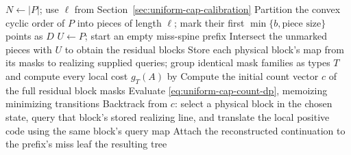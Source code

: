 \begin{algorithm}[H]
\caption{Uniform expected-depth PTAS for bounded convex-position caps}
\label{alg:uniform-cap-ptas}
$N\gets|P|$; use $\ell$ from
Section~\ref{sec:uniform-cap-calibration}\;
Partition the convex cyclic order of $P$ into pieces of length
$\ell$; mark their first $\min\{b,\text{piece size}\}$ points as $D$\;
$U\gets P$; start an empty miss-spine prefix\;
Intersect the unmarked pieces with $U$ to obtain the residual blocks\;
Store each physical block's map from its masks to realizing supplied
queries; group identical mask families as types $T$ and compute every
local cost $g_T(A)$ by \ExactTree\;
Compute the initial count vector $c$ of the full residual block masks\;
Evaluate \eqref{eq:uniform-cap-count-dp}, memoizing minimizing transitions\;
Backtrack from $c$: select a physical block in the chosen state,
query that block's stored realizing line, and translate the local
positive code using the same block's query map\;
Attach the reconstructed continuation to the prefix's miss leaf\;
\KwRet the resulting tree\;
\end{algorithm}
